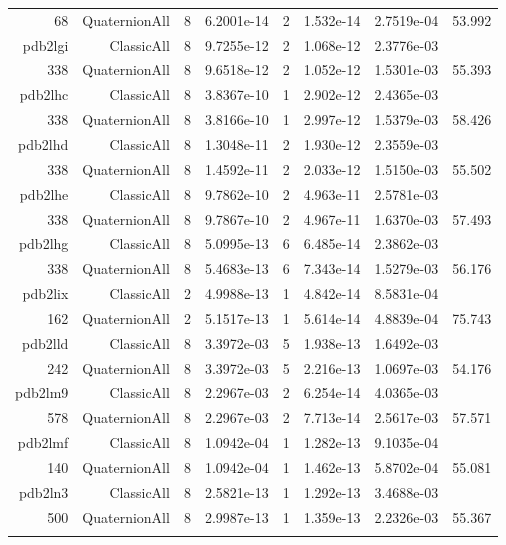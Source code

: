 \begin{xltabular}{\textwidth}{r|rcS[table-format=1.4e+2]cS[table-format=1.3e+2]S[table-format=1.4e+2]S[table-format=-1.3]}
68 & QuaternionAll & 8 & 6.2001e-14 & 2 & 1.532e-14 & 2.7519e-04 & 53.992\\  \addlinespace
pdb2lgi & ClassicAll & 8 & 9.7255e-12 & 2 & 1.068e-12 & 2.3776e-03 & \\
338 & QuaternionAll & 8 & 9.6518e-12 & 2 & 1.052e-12 & 1.5301e-03 & 55.393\\  \addlinespace
pdb2lhc & ClassicAll & 8 & 3.8367e-10 & 1 & 2.902e-12 & 2.4365e-03 & \\
338 & QuaternionAll & 8 & 3.8166e-10 & 1 & 2.997e-12 & 1.5379e-03 & 58.426\\  \addlinespace
pdb2lhd & ClassicAll & 8 & 1.3048e-11 & 2 & 1.930e-12 & 2.3559e-03 & \\
338 & QuaternionAll & 8 & 1.4592e-11 & 2 & 2.033e-12 & 1.5150e-03 & 55.502\\  \addlinespace
pdb2lhe & ClassicAll & 8 & 9.7862e-10 & 2 & 4.963e-11 & 2.5781e-03 & \\
338 & QuaternionAll & 8 & 9.7867e-10 & 2 & 4.967e-11 & 1.6370e-03 & 57.493\\  \addlinespace
pdb2lhg & ClassicAll & 8 & 5.0995e-13 & 6 & 6.485e-14 & 2.3862e-03 & \\
338 & QuaternionAll & 8 & 5.4683e-13 & 6 & 7.343e-14 & 1.5279e-03 & 56.176\\  \addlinespace
pdb2lix & ClassicAll & 2 & 4.9988e-13 & 1 & 4.842e-14 & 8.5831e-04 & \\
162 & QuaternionAll & 2 & 5.1517e-13 & 1 & 5.614e-14 & 4.8839e-04 & 75.743\\  \addlinespace
pdb2lld & ClassicAll & 8 & 3.3972e-03 & 5 & 1.938e-13 & 1.6492e-03 & \\
242 & QuaternionAll & 8 & 3.3972e-03 & 5 & 2.216e-13 & 1.0697e-03 & 54.176\\  \addlinespace
pdb2lm9 & ClassicAll & 8 & 2.2967e-03 & 2 & 6.254e-14 & 4.0365e-03 & \\
578 & QuaternionAll & 8 & 2.2967e-03 & 2 & 7.713e-14 & 2.5617e-03 & 57.571\\  \addlinespace
pdb2lmf & ClassicAll & 8 & 1.0942e-04 & 1 & 1.282e-13 & 9.1035e-04 & \\
140 & QuaternionAll & 8 & 1.0942e-04 & 1 & 1.462e-13 & 5.8702e-04 & 55.081\\  \addlinespace
pdb2ln3 & ClassicAll & 8 & 2.5821e-13 & 1 & 1.292e-13 & 3.4688e-03 & \\
500 & QuaternionAll & 8 & 2.9987e-13 & 1 & 1.359e-13 & 2.2326e-03 & 55.367\\  \addlinespace

\end{xltabular}
